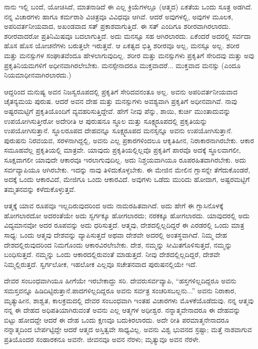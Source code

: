 ನಾನು ಇಲ್ಲಿ ಬಂದೆ, ಯೋಚಿಸಿದೆ, ಮಾತನಾಡಿದೆ ಈ ಎಲ್ಲ ಕ್ರಿಯೆಗಳಲ್ಲೂ (ಆತ್ಮದ) ಏಕತೆಯ ಒಂದು ಸೂತ್ರ ಅಡಗಿದೆ. ನನ್ನ ವಿಚಾರಗಳು ಹಾಗೂ ಕರ್ಮರಾಶಿ ವಿಚಿತ್ರವೂ ವಿವಿಧವೂ ಆಗಿವೆ. ಆದರೆ ಅವುಗಳಲ್ಲಿ, ಅವುಗಳ ಮೂಲಕ, ಅಪರಿವರ್ತನೀಯವಾದ, ಅಖಂಡವಾದ ಸತ್ ಪ್ರಕಾಶವಾಗುತ್ತಿದೆ. ಈ ಸತ್ ಎಂದಿಗೂ ಶರೀರವಾಗಿರಲಾರದು. ಶರೀರವಾದರೋ ಪ್ರತಿನಿಮಿಷವೂ ಬದಲಾಗುತ್ತಿದೆ. ಅದು ಮನಸ್ಸೂ ಸಹ ಆಗಿರಲಾರದು. ಏಕೆಂದರೆ ಅದರಲ್ಲಿ ಸರ್ವದಾ ಹೊಸ ಹೊಸ ಯೋಚನೆಗಳು ಬರುತ್ತಲೇ ಇರುತ್ತವೆ. ಆ ಏಕತ್ವದ ಭಿತ್ತಿ ಶರೀರವೂ ಅಲ್ಲ, ಮನಸ್ಸೂ ಅಲ್ಲ. ಶರೀರ ಮತ್ತು ಮನಸ್ಸುಗಳ ಸಂಘಾತವೆಂದೂ ಹೇಳಲಾಗುವುದಿಲ್ಲ. ಶರೀರ ಮತ್ತು ಮನಸ್ಸುಗಳು ಪ್ರಕೃತಿಗೆ ಸೇರಿದವು ಮತ್ತು ಅವು ಪ್ರಕೃತಿನಿಯಮಗಳಿಗೆ ಅಧೀನವಾಗಿರಲೇಬೇಕು. ಮನಸ್ಸೇನಾದರೂ ಮುಕ್ತವಾದರೆ... ಮುಕ್ತವಾದ ಮನಸ್ಸು (ಎಂದೂ ನಿಯಮಾಧೀನವಾಗಿರಲಾರದು.)

ಆದ್ದರಿಂದ ಮನುಷ್ಯ ಅವನ ನಿಜಸ್ವರೂಪದಲ್ಲಿ ಪ್ರಕೃತಿಗೆ ಸೇರಿದವನಂತೂ ಅಲ್ಲ. ಅವನು ಅಪರಿವರ್ತನೀಯವಾದ ಚೈತನ್ಯಮಯ ಪುರುಷ. ಆದರೆ ಅವನ ದೇಹ ಮತ್ತು ಮನಸ್ಸುಗಳು ಅವಶ್ಯವಾಗಿ ಪ್ರಕೃತಿಗೆ ಅಧೀನವಾಗಿವೆ. ನಾವು ಅಷ್ಟರಮಟ್ಟಿಗೆ ಪ್ರಕೃತಿಯೊಂದಿಗೆ ವ್ಯವಹರಿಸುತ್ತಿದ್ದೇವೆ. ಹೇಗೆ ನೀವು ಪೆನ್ನು, ಶಾಯಿ, ಕುರ್ಚಿ ಮುಂತಾದುವನ್ನು ಉಪಯೋಗಿಸುತ್ತೀರೋ ಅದೇರೀತಿ ಆ ಪುರುಷನೂ ಸ್ಥೂಲ ಮತ್ತು ಸೂಕ್ಷ್ಮರೂಪದಲ್ಲಿ ಪ್ರಕೃತಿಯನ್ನು ಉಪಯೋಗಿಸುತ್ತಾನೆ. ಸ್ಥೂಲರೂಪದ ದೇಹವನ್ನೂ ಸೂಕ್ಷ್ಮರೂಪದ ಮನಸ್ಸನ್ನೂ ಅವನು ಉಪಯೋಗಿಸುತ್ತಾನೆ. ಪುರುಷನು ನಿರವಯವ, ಸರಳನಾಗಿದ್ದಲ್ಲಿ, ಅವನು ಎಲ್ಲ ಪ್ರಕಾರಗಳಿಂದಲೂ ಆಕೃತಿಹೀನ, ನಿರಾಕಾರನಾಗಿರಬೇಕು. ಆಕಾರ ಸಮೂಹವೆಲ್ಲ ಪ್ರಕೃತಿಯಲ್ಲಿ ಮಾತ್ರವೇ. ಯಾವುದು ಪ್ರಕೃತಿಯಲ್ಲಿಲ್ಲವೊ ಪ್ರಕೃತಿಗೆ ಪಾರವೊ ಅದಕ್ಕೆ ಸ್ಥೂಲವಾಗಲೀ, ಸೂಕ್ಷವಾಗಲೀ ಯಾವುದೇ ಆಕಾರವೂ ಇರಲಾಗುವುದಿಲ್ಲ. ಅದು ನಿಶ್ಚಯವಾಗಿಯೂ ರೂಪರಹಿತವಾಗಿರಬೇಕು. ಅದು ಸರ್ವವ್ಯಾಪಿಯೂ ಆಗಿರಬೇಕು. ಇದನ್ನು ನಾವು ತಿಳಿದುಕೊಳ್ಳಬೇಕು. ಈ ಮೇಜಿನ ಮೇಲಿನ ಗ್ಲಾಸನ್ನೇ ತೆಗೆದುಕೊಂಡರೆ, ಅದಕ್ಕೆ ಒಂದು ಆಕಾರವಿದೆ, ಮೇಜಿಗೂ ಒಂದು ಆಕಾರವಿದೆ. ಅವುಗಳು ಒಡೆದು ಮುರಿದು ಹೋದಾಗ, ಅಷ್ಟರಮಟ್ಟಿಗೆ ತಮ್ಮತನವನ್ನು ಕಳೆದುಕೊಳ್ಳುತ್ತವೆ.

ಆತ್ಮಕ್ಕೆ ಯಾವ ರೂಪವೂ ಇಲ್ಲದಿರುವುದರಿಂದ ಅದು ನಾಮರಹಿತವಾಗಿದೆ. ಅದು ಹೇಗೆ ಈ ಗ್ಲಾಸಿನೊಳಕ್ಕೆ ಹೋಗಲಾರದೋ ಅದರಂತೆಯೇ ಅದು ಸ್ವರ್ಗಕ್ಕೂ ಹೋಗಲಾರದು; ನರಕಕ್ಕೂ ಹೋಗಲಾರದು. ಯಾವುದರಲ್ಲಿ ಅದು ವಿದ್ಯಮಾನವೋ ಅದರ ರೂಪವನ್ನು ಅದು ಧರಿಸುತ್ತದೆ. ಆತ್ಮವು, ದೇಶದಲ್ಲಿಲ್ಲದಿದ್ದರೆ ಈ ಎರಡರಲ್ಲಿ ಒಂದು ಮಾತ್ರ ಸಾಧ್ಯ: ಒಂದು ಆತ್ಮವು ದೇಶವನ್ನು ವ್ಯಾಪಿಸುತ್ತದೆ ಅಥವಾ ದೇಶವೇ ಅದರಲ್ಲಿ ಅಂತಸ್ಥವಾಗಿದೆ. ನಿಮ್ಮ ದೇಹ ದೇಶದಲ್ಲಿರುವುದರಿಂದ ನಿಮಗೊಂದು ಆಕಾರವಿರಲೇಬೇಕು. ದೇಶ, ನಮ್ಮನ್ನು ಸೀಮಿತಗೊಳಿಸುತ್ತದೆ, ನಮ್ಮನ್ನು ಬಂಧಿಸುತ್ತದೆ. ನಮ್ಮನ್ನು ಒಂದು ಆಕಾರದಲ್ಲಿರುವಂತೆ ಮಾಡುತ್ತದೆ. ನೀವು ದೇಶದಲ್ಲಿಲ್ಲದಿದ್ದರೆ, ದೇಶವೇ ನಿಮ್ಮಲ್ಲಿರುತ್ತದೆ. ಸ್ವರ್ಗಲೋಕ, ಇಹಲೋಕ ಎಲ್ಲವೂ ಸಚೇತನವಾದ ಪುರುಷನಲ್ಲಿಯೇ ಇದೆ.

ದೇವರ ಸಂಬಂಧವಾಗಿಯೂ ಹೀಗೆಯೇ ಇರಬೇಕಾದ್ದು ಸರಿ. ದೇವರು\break ಸರ್ವವ್ಯಾಪಿ, “ಹಸ್ತಗಳಿಲ್ಲದಿದ್ದರೂ ಅವನು ಸಮಸ್ತವನ್ನೂ ಹಿಡಿದಿಟ್ಟಿರುತ್ತಾನೆ.\break ಪಾದಗಳಿಲ್ಲದಿದ್ದರೂ ಅವನು ಸರ್ವತ್ರ ಸಂಚರಿಸಬಲ್ಲನು...'' ಅವನು ನಿರಾಕಾರ, ಮೃತ್ಯುಹೀನ, ಶಾಶ್ವತ, ಕಾಲಕ್ರಮದಲ್ಲಿ ದೇವರ ಸಂಬಂಧವಾಗಿ ಇಂತಹ ವಿಚಾರಗಳು ಮೊಳಕೆಯೊಡೆದುವು. ನನ್ನ ಆತ್ಮವು ನನ್ನ ಈ ದೇಹದ ಅಧಿಪತಿಯಾಗಿರುವಂತೆ ಅವನು ಎಲ್ಲ ಆತ್ಮಗಳ ಅಧೀಶ್ವರ. ನನ್ನಾತ್ಮವೇನಾದರೂ ಈ ದೇಹವನ್ನು ಬಿಟ್ಟು ಹೋದದ್ದೇ ಆದರೆ ಈ ದೇಹ ಒಂದು ಕ್ಷಣವೂ ಬದುಕಿರಲಾರದು. ಅದೇ ರೀತಿ ಪರಮಾತ್ಮನೇನಾದರೂ ನನ್ನಾತ್ಮದಿಂದ ಬೇರ್ಪಟ್ಟಿದ್ದೇ ಆದರೆ ಆತ್ಮದ ಅಸ್ತಿತ್ವವೇ ಸಾಧ್ಯವಿಲ್ಲ. ಅವನು ವಿಶ್ವ ಭುವನದ ಸ್ರಷ್ಟಾ; ಮತ್ತೆ ನಾಶವಾಗುವ ಪ್ರತಿಯೊಂದರ ಸಂಹಾರಕನೂ ಅವನೇ. ಜೀವನವೂ ಅವನ ನೆರಳು; ಮೃತ್ಯುವೂ ಅವನ ನೆರಳೇ.


